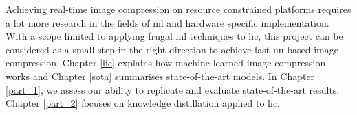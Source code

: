 Achieving real-time image compression on resource constrained platforms requires a lot more research in the fields of \acrshort{ml} and hardware specific implementation. With a scope limited to applying frugal \acrshort{ml} techniques to \acrshort{lic}, this project can be considered as a small step in the right direction to achieve fast \acrshort{nn} based image compression. Chapter \ref{lic} explains how machine learned image compression works and Chapter \ref{sota} summarises state-of-the-art models. In Chapter \ref{part_1}, we assess our ability to replicate and evaluate state-of-the-art results. Chapter \ref{part_2} focuses on knowledge distillation applied to \acrshort{lic}.
